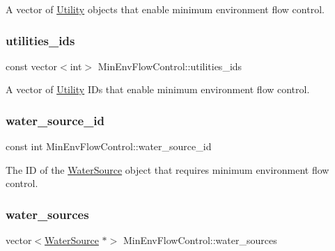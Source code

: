 A vector of \mbox{\hyperlink{classUtility}{Utility}} objects that enable minimum environment flow control. 

\mbox{\label{classMinEnvFlowControl_a5c67ab20c181a1d22e4bf94e398451fc}} 
\subsubsection{\texorpdfstring{utilities\+\_\+ids}{utilities\_ids}}
{\footnotesize\ttfamily const vector$<$int$>$ Min\+Env\+Flow\+Control\+::utilities\+\_\+ids}



A vector of \mbox{\hyperlink{classUtility}{Utility}} I\+Ds that enable minimum environment flow control. 

\mbox{\label{classMinEnvFlowControl_aada518a047598f386daec1d0358023aa}} 
\subsubsection{\texorpdfstring{water\+\_\+source\+\_\+id}{water\_source\_id}}
{\footnotesize\ttfamily const int Min\+Env\+Flow\+Control\+::water\+\_\+source\+\_\+id}



The ID of the \mbox{\hyperlink{classWaterSource}{Water\+Source}} object that requires minimum environment flow control. 

\mbox{\label{classMinEnvFlowControl_a36b50d0e6887b956051ae53bf5d2e3a9}} 
\subsubsection{\texorpdfstring{water\+\_\+sources}{water\_sources}}
{\footnotesize\ttfamily vector$<$\mbox{\hyperlink{classWaterSource}{Water\+Source}} $\ast$$>$ Min\+Env\+Flow\+Control\+::water\+\_\+sources\hspace{0.3cm}{\ttfamily [protected]}}



